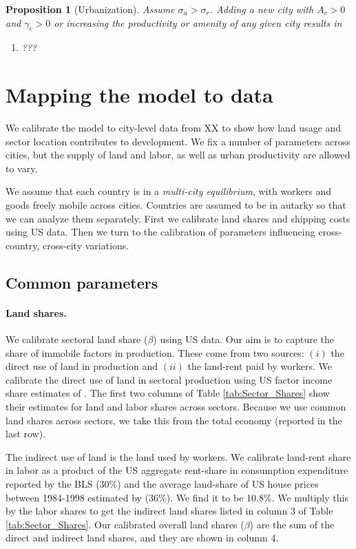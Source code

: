 \documentclass[12pt]{article}
\newtheorem{proposition}{Proposition}
\begin{document}
\begin{proposition}[Urbanization]\label{prop:city}
Assume $\sigma_u>\sigma_r$. Adding a new city with $A_c>0$ and $\gamma_c>0$ or increasing the productivity or amenity of any given city results in
\begin{enumerate}
	\item ???
\end{enumerate}
\end{proposition}

\section{Mapping the model to data}
We calibrate the model to city-level data from XX to show how land usage and sector location contributes to development. We fix a number of parameters across cities, but the supply of land and labor, as well as urban productivity are allowed to vary.

We assume that each country is in a \emph{multi-city equilibrium}, with workers and goods freely mobile across cities. Countries are assumed to be in autarky so that we can analyze them separately. First we calibrate land shares and shipping costs using US data. Then we turn to the calibration of parameters influencing cross-country, cross-city variations.

\subsection{Common parameters}
\paragraph{Land shares.}
We calibrate sectoral land share ($\beta$) using US data. Our aim is to capture the share of immobile factors in production. These come from two sources: $(i)$ the direct use of land in production and $(ii)$ the land-rent paid by workers. We calibrate the direct use of land in sectoral production using US factor income share estimates of . The first two columns of Table \ref{tab:Sector_Shares} show their estimates for land and labor shares across sectors. Because we use common land shares across sectors, we take this from the total economy (reported in the last row).

The indirect use of land is the land used by workers. We calibrate land-rent share in labor as a product of the US aggregate rent-share in consumption expenditure reported by the BLS ($30\%$) and the average land-share of US house prices between 1984-1998 estimated by  (36\%). We find it to be 10.8\%. We multiply this by the labor shares to get the indirect land shares listed in column 3 of Table \ref{tab:Sector_Shares}. Our calibrated overall land shares ($\beta$) are the sum of the direct and indirect land shares, and they are shown in column 4.
\end{document}
